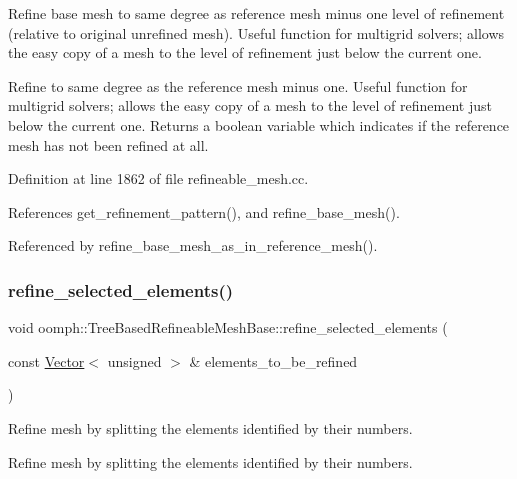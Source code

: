 Refine base mesh to same degree as reference mesh minus one level of refinement (relative to original unrefined mesh). Useful function for multigrid solvers; allows the easy copy of a mesh to the level of refinement just below the current one. 

Refine to same degree as the reference mesh minus one. Useful function for multigrid solvers; allows the easy copy of a mesh to the level of refinement just below the current one. Returns a boolean variable which indicates if the reference mesh has not been refined at all. 

Definition at line 1862 of file refineable\+\_\+mesh.\+cc.



References get\+\_\+refinement\+\_\+pattern(), and refine\+\_\+base\+\_\+mesh().



Referenced by refine\+\_\+base\+\_\+mesh\+\_\+as\+\_\+in\+\_\+reference\+\_\+mesh().

\mbox{\label{classoomph_1_1TreeBasedRefineableMeshBase_a171be4c171cc60de5831f6a2ffaf278e}} 
\subsubsection{\texorpdfstring{refine\+\_\+selected\+\_\+elements()}{refine\_selected\_elements()}\hspace{0.1cm}{\footnotesize\ttfamily [1/2]}}
{\footnotesize\ttfamily void oomph\+::\+Tree\+Based\+Refineable\+Mesh\+Base\+::refine\+\_\+selected\+\_\+elements (\begin{DoxyParamCaption}\item[{const \hyperlink{classoomph_1_1Vector}{Vector}$<$ unsigned $>$ \&}]{elements\+\_\+to\+\_\+be\+\_\+refined }\end{DoxyParamCaption})\hspace{0.3cm}{\ttfamily [virtual]}}



Refine mesh by splitting the elements identified by their numbers. 

Refine mesh by splitting the elements identified by their numbers. 

